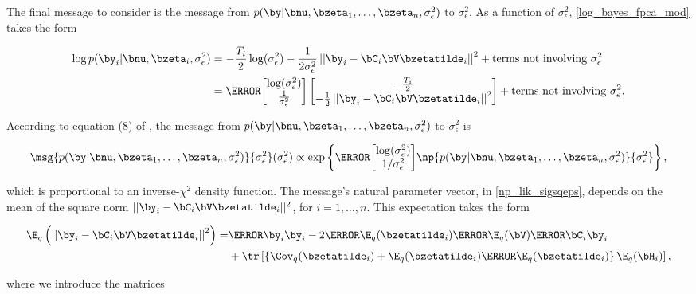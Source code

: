 \documentclass[12pt]{article}
\def\sigsqeps{\sigma^2_{\epsilon}}
\newcommand\tni[1]{\text{terms not involving $#1$}}
\theoremstyle{plain}
\theoremstyle{definition}
\theoremstyle{remark}
\begin{document}
The final message to consider is the message from $p (\by | \bnu, \bzeta_1, \dots, \bzeta_n, \sigsqeps)$ to
$\sigsqeps$. As a function of $\sigsqeps$, \eqref{log_bayes_fpca_mod} takes the form

\begin{align*}
	\log p (\by_i | \bnu, \bzeta_i, \sigsqeps)
		& = -\frac{T_i}{2} \log (\sigsqeps) - \frac{1}{2 \sigsqeps} \left|\left|
			\by_i - \bC_i \bV \bzetatilde_i
		\right|\right|^2 + \tni{\sigsqeps} \\
		& = \T{
			\begin{bmatrix}
				\log (\sigsqeps) \\
				\frac{1}{\sigsqeps}
			\end{bmatrix}
		} \begin{bmatrix}
			-\frac{T_i}{2} \\
			-\frac12 \left|\left| \by_i - \bC_i \bV \bzetatilde_i \right|\right|^2
		\end{bmatrix} + \tni{\sigsqeps},
\end{align*}

\noindent According to equation (8) of , the message from $p (\by | \bnu,
\bzeta_1, \dots, \bzeta_n, \sigsqeps)$ to $\sigsqeps$ is

\[
	\msg{p (\by | \bnu, \bzeta_1, \dots, \bzeta_n, \sigsqeps)}{\sigsqeps} (\sigsqeps) \propto
		\exp \left\{
			\T{\begin{bmatrix}
				\log (\sigsqeps) \\
				1/\sigsqeps
			\end{bmatrix}}
			\np{p (\by | \bnu, \bzeta_1, \dots, \bzeta_n, \sigsqeps)}{\sigsqeps}
		\right\},
\]

\noindent which is proportional
to an inverse-$\chi^2$ density function. The message's natural parameter vector, in \eqref{np_lik_sigsqeps}, depends
on the mean of the square norm $|| \by_i - \bC_i \bV \bzetatilde_i ||^2$, for $i = 1, \dots, n$.
This expectation takes the form

\begin{align*}
	\E_q \left(
		\left|\left| \by_i - \bC_i \bV \bzetatilde_i \right|\right|^2
	\right) =
		& \T{\by_i} \by_i - 2 \T{\E_q (\bzetatilde_i)} \T{\E_q (\bV)} \T{\bC_i} \by_i \\
		& + \tr \left[
			\left\{ \Cov_q (\bzetatilde_i) + \E_q (\bzetatilde_i) \T{\E_q (\bzetatilde_i)} \right\} \E_q (\bH_i)
		\right],
\end{align*}

\noindent where we introduce the matrices
\end{document}
